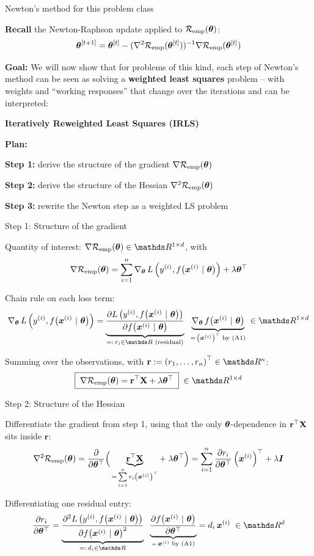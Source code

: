 \documentclass[11pt,compress,t,notes=noshow, xcolor=table]{beamer}
\begin{document}
\begin{framei}{Newton's method for this problem class}
\item \textbf{Recall} the Newton-Raphson update applied to $\mathcal{R}_{\text{emp}}(\bm{\theta})$:
$$
\bm{\theta}^{[t +1]} = \bm{\theta}^{[t]} - (\nabla^2 \mathcal{R}_{\text{emp}}(\bm{\theta}^{[t]}))^{-1} \nabla \mathcal{R}_{\text{emp}}(\bm{\theta}^{[t]})
$$
\item \textbf{Goal:} We will now show that for problems of this kind, each step of Newton's method can be seen as solving a \textbf{weighted least squares} problem -- with weights and \enquote{working responses} that change over the iterations and can be interpreted:
\begin{framed}
\centering
\textbf{Iteratively Reweighted Least Squares (IRLS)}
\end{framed}
\vfill
\item \textbf{Plan:}
\begin{itemizeS}
\item \textbf{Step 1:} derive the structure of the gradient $\nabla \mathcal{R}_{\text{emp}}(\bm{\theta})$
\item \textbf{Step 2:} derive the structure of the Hessian $\nabla^2 \mathcal{R}_{\text{emp}}(\bm{\theta})$
\item \textbf{Step 3:} rewrite the Newton step as a weighted LS problem
\end{itemizeS}
\end{framei}


\begin{framei}[fs=small]{Step 1: Structure of the gradient}
\item Quantity of interest: $\nabla \risket \in \R^{1 \times d}$, with
$$
\nabla \mathcal{R}_{\text{emp}}(\bm{\theta}) = \sum\limits_{i=1}^n \nabla_{\bm{\theta}}\, L\left(y^{(i)}, f\big(\bm{x}^{(i)} ~|~ \bm{\theta}\big)\right) + \lambda \bm{\theta}^\top
$$
\item Chain rule on each loss term:
$$
\nabla_{\thetav}\, \Lxyit
= \underbrace{\frac{\partial \Lxyit}{\partial \fxit}}_{=:\, r_i \in \R \text{ (residual)}}
\;\; \underbrace{\nabla_{\thetav}\, \fxit}_{=\, \left(\xi\right)^\top \text{ by (A1)}}
\; \in \R^{1 \times d}
$$
\item Summing over the observations, with $\mathbf{r} := \left(r_1, \dots, r_n\right)^\top \in \R^n$:
$$
\boxed{\;\nabla \risket = \mathbf{r}^\top \Xmat + \lambda \thetav^\top\;} \; \in \R^{1 \times d}
$$
\end{framei}


\begin{framei}[fs=small]{Step 2: Structure of the Hessian}
\item Differentiate the gradient from step 1, using that the only $\bm{\theta}$-dependence in $\mathbf{r}^\top \mathbf{X}$ sits inside $\mathbf{r}$:
$$
\nabla^2 \mathcal{R}_{\text{emp}}(\bm{\theta})
= \frac{\partial}{\partial \bm{\theta}^\top} \Big(\underbrace{\mathbf{r}^\top \mathbf{X}}_{=\, \sum\limits_{i=1}^n r_i \left(\bm{x}^{(i)}\right)^\top} + \; \lambda \bm{\theta}^\top\Big)
= \sum\limits_{i=1}^n \frac{\partial r_i}{\partial \bm{\theta}^\top} \left(\bm{x}^{(i)}\right)^\top + \lambda \bm{I}
$$
\item Differentiating one residual entry:
$$
\frac{\partial r_i}{\partial \thetav^\top}
= \underbrace{\frac{\partial^2 \Lxyit}{\partial {\fxit}^2}}_{=:\, d_i \in \R}
\;\; \underbrace{\frac{\partial \fxit}{\partial \thetav^\top}}_{=\, \xi \text{ by (A1)}}
= d_i\, \xi \; \in \R^{d}
$$
\end{framei}
\end{document}
